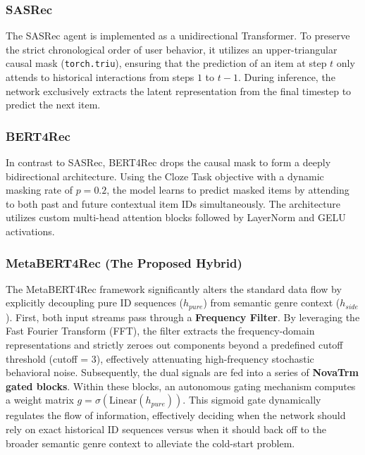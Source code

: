 \documentclass[conference]{IEEEtran}
\begin{document}
\subsubsection{SASRec}
The SASRec agent is implemented as a unidirectional Transformer. To preserve the strict chronological order of user behavior, it utilizes an upper-triangular causal mask (\texttt{torch.triu}), ensuring that the prediction of an item at step $t$ only attends to historical interactions from steps $1$ to $t-1$. During inference, the network exclusively extracts the latent representation from the final timestep to predict the next item.

\subsubsection{BERT4Rec}
In contrast to SASRec, BERT4Rec drops the causal mask to form a deeply bidirectional architecture. Using the Cloze Task objective with a dynamic masking rate of $p=0.2$, the model learns to predict masked items by attending to both past and future contextual item IDs simultaneously. The architecture utilizes custom multi-head attention blocks followed by LayerNorm and GELU activations.

\subsubsection{MetaBERT4Rec (The Proposed Hybrid)}
The MetaBERT4Rec framework significantly alters the standard data flow by explicitly decoupling pure ID sequences ($h_{pure}$) from semantic genre context ($h_{side}$). 
First, both input streams pass through a \textbf{Frequency Filter}. By leveraging the Fast Fourier Transform (FFT), the filter extracts the frequency-domain representations and strictly zeroes out components beyond a predefined cutoff threshold (cutoff = 3), effectively attenuating high-frequency stochastic behavioral noise. 
Subsequently, the dual signals are fed into a series of \textbf{NovaTrm gated blocks}. Within these blocks, an autonomous gating mechanism computes a weight matrix $g = \sigma(\text{Linear}(h_{pure}))$. This sigmoid gate dynamically regulates the flow of information, effectively deciding when the network should rely on exact historical ID sequences versus when it should back off to the broader semantic genre context to alleviate the cold-start problem.
\end{document}
